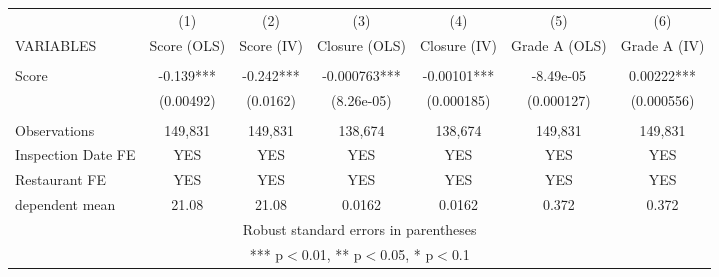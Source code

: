 \begin{tabular}{lcccccc} \hline
 & (1) & (2) & (3) & (4) & (5) & (6) \\
VARIABLES & Score (OLS) & Score (IV) & Closure (OLS) & Closure (IV) & Grade A (OLS) & Grade A (IV) \\ \hline
 &  &  &  &  &  &  \\
Score & -0.139*** & -0.242*** & -0.000763*** & -0.00101*** & -8.49e-05 & 0.00222*** \\
 & (0.00492) & (0.0162) & (8.26e-05) & (0.000185) & (0.000127) & (0.000556) \\
 &  &  &  &  &  &  \\
Observations & 149,831 & 149,831 & 138,674 & 138,674 & 149,831 & 149,831 \\
Inspection Date FE & YES & YES & YES & YES & YES & YES \\
Restaurant FE & YES & YES & YES & YES & YES & YES \\
 dependent mean & 21.08 & 21.08 & 0.0162 & 0.0162 & 0.372 & 0.372 \\ \hline
\multicolumn{7}{c}{ Robust standard errors in parentheses} \\
\multicolumn{7}{c}{ *** p$<$0.01, ** p$<$0.05, * p$<$0.1} \\
\end{tabular}
